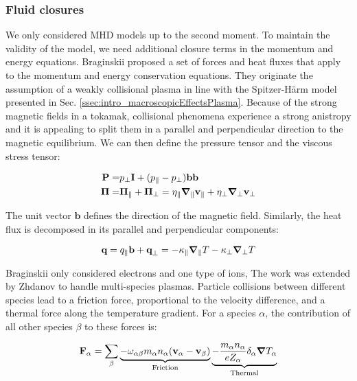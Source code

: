 \subsubsection{Fluid closures}
\label{sec:desc_fluidClosures}

We only considered MHD models up to the second moment. To maintain the validity of the model, we need additional closure terms in the momentum and energy equations. Braginskii\cite{braginskii1965transport} proposed a set of forces and heat fluxes that apply to the momentum and energy conservation equations. They originate the assumption of a weakly collisional plasma in line with the Spitzer-Härm model presented in Sec. \ref{ssec:intro_macroscopicEffectsPlasma}. Because of the strong magnetic fields in a tokamak, collisional phenomena experience a strong anistropy and it is appealing to split them in a parallel and perpendicular direction to the magnetic equilibrium. We can then define the pressure tensor and the viscous stress tensor:

\begin{align}
	\textbf{P} =& p_\perp\textbf{I} + (p_\parallel-p_\perp)\textbf{b}\textbf{b} \\
	\boldsymbol{\Pi} =& \boldsymbol{\Pi}_\parallel + \boldsymbol{\Pi}_\perp = \eta_\parallel\grad_\parallel \textbf{v}_\parallel + \eta_\perp\grad_\perp \textbf{v}_\perp
\end{align}

The unit vector $\textbf{b}$ defines the direction of the magnetic field. Similarly, the heat flux is decomposed in its parallel and perpendicular components:

\begin{equation}
	\textbf{q} = q_\parallel \textbf{b} + \textbf{q}_\perp = -\kappa_\parallel \grad_{\parallel}T - \kappa_\perp \grad_{\perp}T
\end{equation}

Braginskii only considered electrons and one type of ions, The work was extended by Zhdanov\cite{zhdanov2002transport} to handle multi-species plasmas. Particle collisions between different species lead to a friction force, proportional to the velocity difference, and a thermal force along the temperature gradient. For a species $\alpha$, the contribution of all other species $\beta$ to these forces is:

\begin{equation}
	\textbf{F}_\alpha  =\sum_\beta \underbrace{-\omega_{\alpha\beta}m_\alpha n_\alpha(\mathbf{v_\alpha}-\mathbf{v}_\beta)}_{\text{Friction}} \underbrace{-\frac{m_\alpha n_\alpha}{eZ_\alpha}\delta_\alpha\grad T_\alpha}_{\text{Thermal}}
\end{equation}

